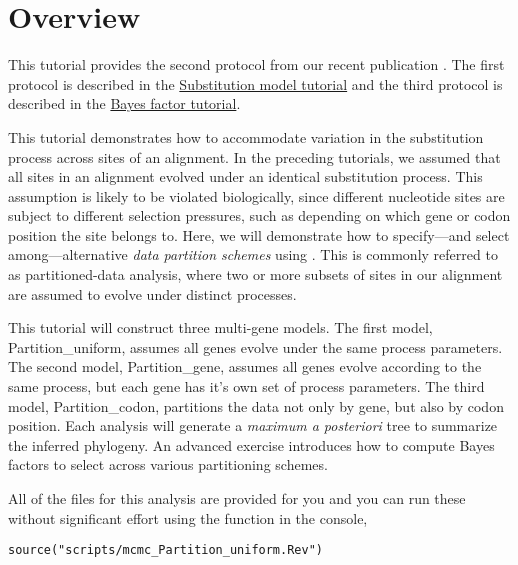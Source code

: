 \section{Overview}

This tutorial provides the second protocol from our recent publication \citep{Hoehna2017a}.
The first protocol is described in the \href{https://github.com/revbayes/revbayes_tutorial/raw/master/tutorial_TeX/RB_CTMC_Tutorial/RB_CTMC_Tutorial.pdf}{Substitution model tutorial} and the third protocol is described in the \href{https://github.com/revbayes/revbayes_tutorial/raw/master/tutorial_TeX/RB_BayesFactor_Tutorial/RB_BayesFactor_Tutorial.pdf}{Bayes factor tutorial}.

This tutorial demonstrates how to accommodate variation in the substitution process across sites of an alignment.
In the preceding tutorials, we assumed that all sites in an alignment evolved under an identical substitution process.
This assumption is likely to be violated biologically, since different nucleotide sites are subject to different selection pressures, such as depending on which gene or codon position the site belongs to.
Here, we will demonstrate how to specify---and select among---alternative \emph{data partition schemes} using \RevBayes.
This is commonly referred to as partitioned-data analysis, where two or more subsets of sites in our alignment are assumed to evolve under distinct processes.

This tutorial will construct three multi-gene models.
The first model, Partition\_uniform, assumes all genes evolve under the same process parameters.
The second model, Partition\_gene, assumes all genes evolve according to the same process, but each gene has it's own set of process parameters.
The third model, Partition\_codon, partitions the data not only by gene, but also by codon position.
Each analysis will generate a \emph{maximum a posteriori} tree to summarize the inferred phylogeny.
An advanced exercise introduces how to compute Bayes factors to select across various partitioning schemes.

All of the files for this analysis are provided for you and you can run these without significant effort using the  function in the \RevBayes console, \EG
{\tt \begin{snugshade*}
\begin{lstlisting}
source("scripts/mcmc_Partition_uniform.Rev")
\end{lstlisting}
\end{snugshade*}}

